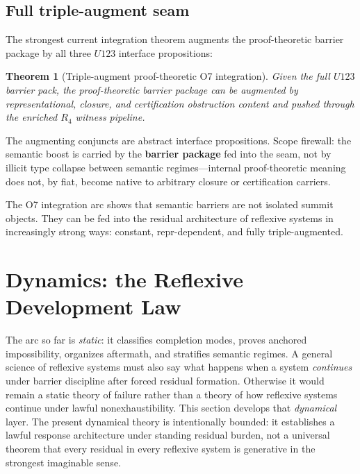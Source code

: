 \documentclass[11pt]{article}
\theoremstyle{plain}
\newtheorem{theorem}{Theorem}[section]
\theoremstyle{definition}
\theoremstyle{remark}
\begin{document}
\subsection{Full triple-augment seam}

The strongest current integration theorem augments the proof-theoretic barrier package by all three \(U123\) interface propositions:

\begin{theorem}[Triple-augment proof-theoretic O7 integration]
Given the full \(U123\) barrier pack, the proof-theoretic barrier package can be augmented by representational, closure, and certification obstruction content and pushed through the enriched \(R_4\) witness pipeline.
\end{theorem}

The augmenting conjuncts are abstract interface propositions. Scope firewall: the semantic boost is carried by the \textbf{barrier package} fed into the seam, not by illicit type collapse between semantic regimes---internal proof-theoretic meaning does not, by fiat, become native to arbitrary closure or certification carriers.

\begin{keybox}
The O7 integration arc shows that semantic barriers are not isolated summit objects. They can be fed into the residual architecture of reflexive systems in increasingly strong ways: constant, repr-dependent, and fully triple-augmented.
\end{keybox}

\section{Dynamics: the Reflexive Development Law}

The arc so far is \emph{static}: it classifies completion modes, proves anchored impossibility, organizes aftermath, and stratifies semantic regimes. A general science of reflexive systems must also say what happens when a system \emph{continues} under barrier discipline after forced residual formation. Otherwise it would remain a static theory of failure rather than a theory of how reflexive systems continue under lawful nonexhaustibility. This section develops that \emph{dynamical} layer. The present dynamical theory is intentionally bounded: it establishes a lawful response architecture under standing residual burden, not a universal theorem that every residual in every reflexive system is generative in the strongest imaginable sense.
\end{document}

